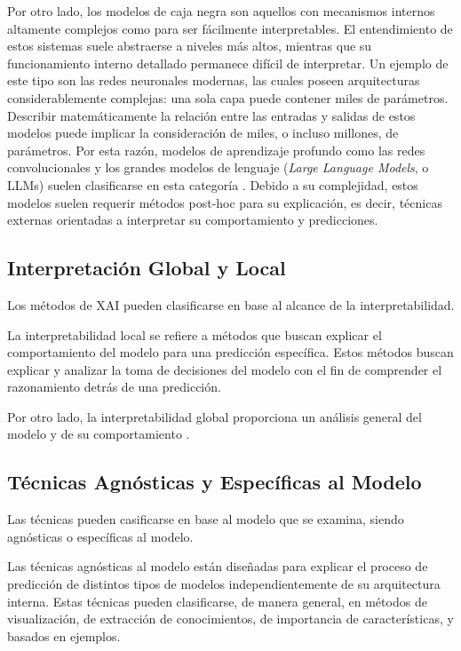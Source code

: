 Por otro lado, los modelos de caja negra son aquellos con mecanismos internos altamente complejos como para 
ser fácilmente interpretables. El entendimiento de estos sistemas suele abstraerse a niveles más altos, 
mientras que su funcionamiento interno detallado permanece difícil de interpretar. Un ejemplo de este 
tipo son las redes neuronales modernas, las cuales poseen arquitecturas considerablemente complejas: una 
sola capa puede contener miles de parámetros. Describir matemáticamente la relación entre las entradas y 
salidas de estos modelos puede implicar la consideración de miles, o incluso millones, de parámetros. Por 
esta razón, modelos de aprendizaje profundo como las redes convolucionales y los grandes modelos de 
lenguaje (\textit{Large Language Models}, o LLMs) suelen clasificarse en esta 
categoría \parencite{dwivedi2023explainable}. Debido a su complejidad, estos modelos suelen requerir métodos 
post-hoc para su explicación, es decir, técnicas externas orientadas a interpretar su comportamiento y 
predicciones.

\subsection{Interpretación Global y Local}
Los métodos de XAI pueden clasificarse en base al alcance de la interpretabilidad.
\medskip

La interpretabilidad local se refiere a métodos que buscan explicar el comportamiento del modelo para una 
predicción específica. Estos métodos buscan explicar y analizar la toma de decisiones del modelo con el fin 
de comprender el razonamiento detrás de una predicción.
\medskip

Por otro lado, la interpretabilidad global proporciona un análisis general del modelo y de su 
comportamiento \parencite{dwivedi2023explainable}.

\subsection{Técnicas Agnósticas y Específicas al Modelo}
Las técnicas pueden casificarse en base al modelo que se examina, siendo agnósticas o específicas al modelo.
\medskip

Las técnicas agnósticas al modelo están diseñadas para explicar el proceso de predicción de 
distintos tipos de modelos independientemente de su arquitectura interna. Estas técnicas pueden 
clasificarse, de manera general, en métodos de visualización, de extracción de conocimientos, de importancia
de características, y basados en ejemplos.
\medskip

